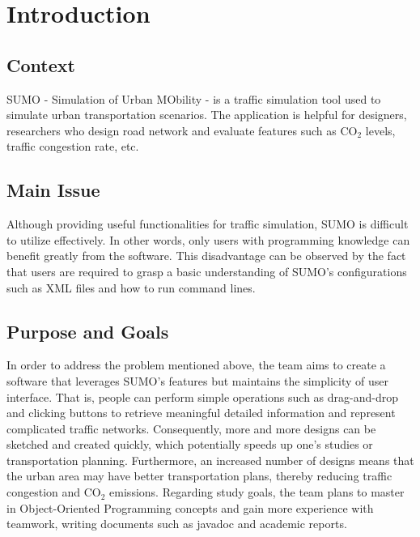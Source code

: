 \documentclass[a4paper, 12pt]{article}
\begin{document}
\pagestyle{fancy}

\newpage
\begin{abstract}
    This report provides progress, purpose, and other detailed informations about simpfi, a real-time traffic simulation app in which users can simulate real-world transportation scenarios and export useful statistics. 
\end{abstract}

\newpage
\listoftables
\listoffigures

\newpage
\renewcommand{\contentsname}{Contents}
\vspace{1cm}
\tableofcontents
\newpage

\section{Introduction}
\subsection{Context}
SUMO - Simulation of Urban MObility - is a traffic simulation tool used to simulate urban transportation scenarios.
The application is helpful for designers, researchers who design road network and evaluate features such as CO$_2$ levels, traffic congestion rate, etc.
\subsection{Main Issue}
Although providing useful functionalities for traffic simulation, SUMO is difficult to utilize effectively. In other words, only users with programming knowledge can benefit greatly from the software. \newline 
This disadvantage can be observed by the fact that users are required to grasp a basic understanding of SUMO's configurations such as XML files and how to run command lines.
\subsection{Purpose and Goals}
In order to address the problem mentioned above, the team aims to create a software that leverages SUMO's features but maintains the simplicity of user interface. That is, people can perform simple operations such as drag-and-drop and clicking buttons to retrieve meaningful detailed information and represent complicated traffic networks. Consequently, more and more designs can be sketched and created quickly, which potentially speeds up one's studies or transportation planning. Furthermore, an increased number of designs means that the urban area may have better transportation plans, thereby reducing traffic congestion and CO$_2$ emissions. \newline
Regarding study goals, the team plans to master in Object-Oriented Programming concepts and gain more experience with teamwork, writing documents such as javadoc and academic reports.
\end{document}
